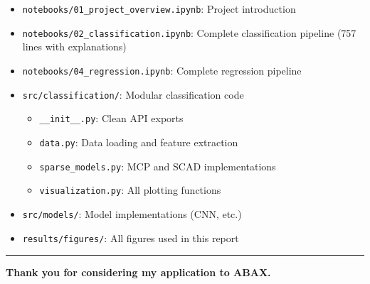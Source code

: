 \documentclass[11pt,a4paper]{article}
\begin{document}
\begin{itemize}[leftmargin=*]
    \item \texttt{notebooks/01\_project\_overview.ipynb}: Project introduction
    \item \texttt{notebooks/02\_classification.ipynb}: Complete classification pipeline (757 lines with explanations)
    \item \texttt{notebooks/04\_regression.ipynb}: Complete regression pipeline
    \item \texttt{src/classification/}: Modular classification code
    \begin{itemize}
        \item \texttt{\_\_init\_\_.py}: Clean API exports
        \item \texttt{data.py}: Data loading and feature extraction
        \item \texttt{sparse\_models.py}: MCP and SCAD implementations
        \item \texttt{visualization.py}: All plotting functions
    \end{itemize}
    \item \texttt{src/models/}: Model implementations (CNN, etc.)
    \item \texttt{results/figures/}: All figures used in this report
\end{itemize}

\vspace{1cm}
\hrule
\vspace{0.5cm}
\textbf{Thank you for considering my application to ABAX.}
\end{document}
